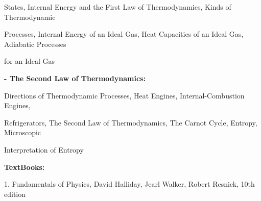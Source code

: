 \documentclass[12pt,a4paper]{article}
\begin{document}
States, Internal Energy and the First Law of Thermodynamics, Kinds of Thermodynamic\par
Processes, Internal Energy of an Ideal Gas, Heat Capacities of an Ideal Gas, Adiabatic Processes\par
for an Ideal Gas\par
\vspace{2pt}\textbf{- The Second Law of Thermodynamics:}\par
Directions of Thermodynamic Processes, Heat Engines, Internal-Combustion Engines,\par
Refrigerators, The Second Law of Thermodynamics, The Carnot Cycle, Entropy, Microscopic\par
Interpretation of Entropy\par\vspace{4pt}
\textbf{TextBooks:}\par\vspace{2pt}
1. Fundamentals of Physics, David Halliday, Jearl Walker, Robert Resnick, 10th edition\par
\vspace{4pt}
\end{document}
